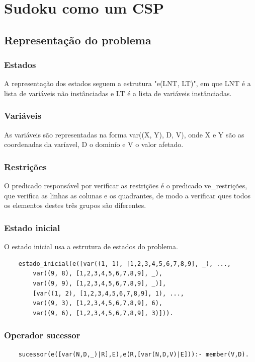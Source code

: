 \documentclass{article}
\begin{document}
\newpage
\section{Sudoku como um CSP}
\subsection{Representação do problema}
\subsubsection{Estados}
A representação dos estados seguem a estrutura "e(LNT, LT)", em que LNT é a lista de variáveis não instânciadas e LT é a lista de variáveis instânciadas.

\subsubsection{Variáveis}
As variáveis são representadas na forma var((X, Y), D, V), onde X e Y são as coordenadas da varíavel, D o dominío e V o valor afetado.

\subsubsection{Restrições}
O predicado responsável por verificar as restrições é o predicado ve\_restrições, que verifica as linhas as colunas e os quadrantes, de modo a verificar ques todos os elementos destes três grupos são diferentes.

\subsubsection{Estado inicial}
O estado inicial usa a estrutura de estados do problema.

\begin{verbatim}
    estado_inicial(e([var((1, 1), [1,2,3,4,5,6,7,8,9], _), ..., 
        var((9, 8), [1,2,3,4,5,6,7,8,9], _), 
        var((9, 9), [1,2,3,4,5,6,7,8,9], _)],
        [var((1, 2), [1,2,3,4,5,6,7,8,9], 1), ..., 
        var((9, 3), [1,2,3,4,5,6,7,8,9], 6), 
        var((9, 6), [1,2,3,4,5,6,7,8,9], 3)])).
\end{verbatim}

\subsubsection{Operador sucessor}

\begin{verbatim}
    sucessor(e([var(N,D,_)|R],E),e(R,[var(N,D,V)|E])):- member(V,D).
\end{verbatim}
\end{document}
